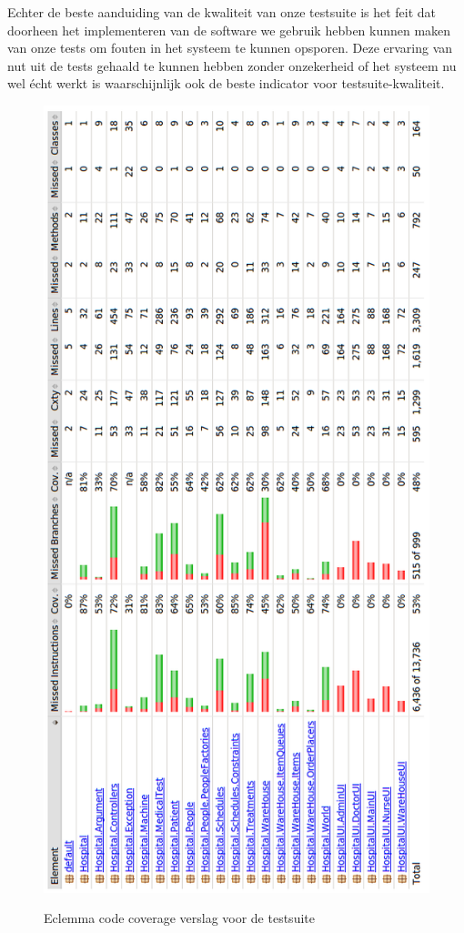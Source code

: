 \documentclass[a4paper]{article}
\begin{document}
Echter de beste aanduiding van de kwaliteit van onze testsuite is het feit dat doorheen het implementeren van de software we gebruik hebben kunnen maken van onze tests om fouten in het systeem te kunnen opsporen. Deze ervaring van nut uit de tests gehaald te kunnen hebben zonder onzekerheid of het systeem nu wel \'echt werkt is waarschijnlijk ook de beste indicator voor testsuite-kwaliteit.

\begin{figure}[h]
\centering
\caption{Eclemma code coverage verslag voor de testsuite}
\includegraphics[height=\textheight]{Pictures/Eclemma}
\label{fig:eclemma}
\end{figure}
\end{document}
